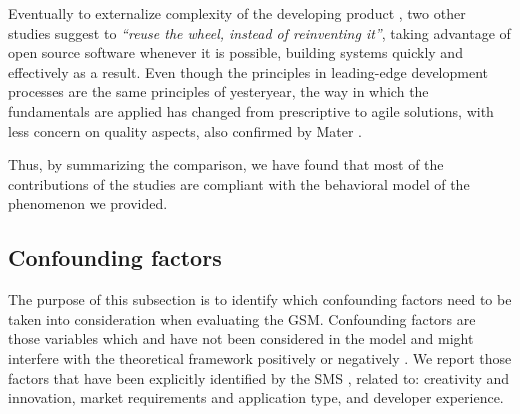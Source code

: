 \documentclass[10pt,journal,letterpaper,compsoc]{IEEEtran}
\begin{document}
Eventually to externalize complexity of the developing product %
, two other studies \cite{Wall2001, Bean2005} suggest to \textit{``reuse the 
wheel, instead of reinventing it''}, taking advantage of open source software 
whenever it is possible, building systems quickly and effectively as a result. 
Even though the principles in leading-edge development processes are the same 
principles of yesteryear, the way in which the fundamentals are applied has 
changed from prescriptive to agile solutions, with less concern on quality 
aspects, also confirmed by Mater \cite{Mater2000}.


Thus, by summarizing the comparison, we have found that most of the 
contributions of the studies are compliant with the behavioral model of the 
phenomenon we provided.

\subsection{Confounding factors}
\label{sect:an:comp:cat-vs-literature:conf}

The purpose of this subsection is to identify which confounding factors need to 
be taken into consideration when evaluating the GSM. Confounding factors are 
those variables which and have not been considered in the model and might 
interfere with the theoretical framework positively or negatively 
\cite{ColinRobson2009}. We report those factors that have been explicitly 
identified by the SMS \cite{SMS} %
, related to: creativity and innovation, market requirements and application 
type, and developer experience.
\end{document}
